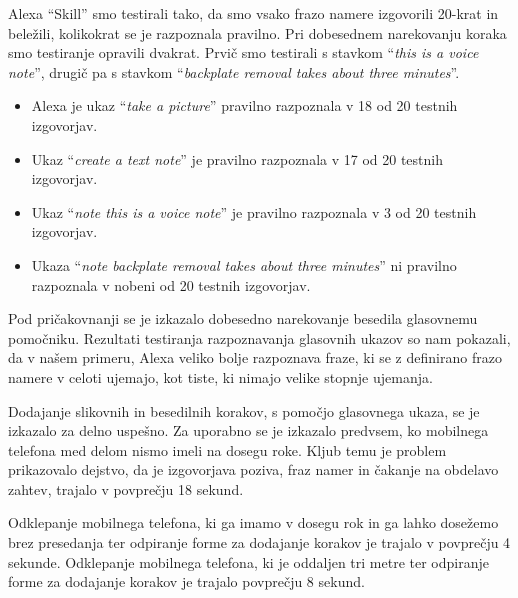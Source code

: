 \documentclass[a4paper, 12pt]{book}
\begin{document}
Alexa \enquote{Skill} smo testirali tako, da smo vsako frazo namere izgovorili 20-krat in beležili, kolikokrat se je razpoznala pravilno.
Pri dobesednem narekovanju koraka smo testiranje opravili dvakrat.
Prvič smo testirali s stavkom \enquote{\textit{this is a voice note}}, drugič pa s stavkom \enquote{\textit{backplate removal takes about three minutes}}.
\begin{itemize}
	\item Alexa je ukaz \enquote{\textit{take a picture}} pravilno razpoznala v 18 od 20 testnih izgovorjav.
	\item Ukaz \enquote{\textit{create a text note}} je pravilno razpoznala v 17 od 20 testnih izgovorjav.
	\item Ukaz \enquote{\textit{note this is a voice note}} je pravilno razpoznala v 3 od 20 testnih izgovorjav.
	\item Ukaza \enquote{\textit{note backplate removal takes about three minutes}} ni pravilno razpoznala v nobeni od 20 testnih izgovorjav.
\end{itemize}
Pod pričakovnanji se je izkazalo dobesedno narekovanje besedila glasovnemu pomočniku.
Rezultati testiranja razpoznavanja glasovnih ukazov so nam pokazali, da v našem primeru, Alexa veliko bolje razpoznava fraze, ki se z definirano frazo namere v celoti ujemajo, kot tiste, ki nimajo velike stopnje ujemanja.

Dodajanje slikovnih in besedilnih korakov, s pomočjo glasovnega ukaza, se je izkazalo za delno uspešno.
Za uporabno se je izkazalo predvsem, ko mobilnega telefona med delom nismo imeli na dosegu roke.
Kljub temu je problem prikazovalo dejstvo, da je izgovorjava poziva, fraz namer in čakanje na obdelavo zahtev, trajalo v povprečju 18 sekund.


Odklepanje mobilnega telefona, ki ga imamo v dosegu rok in ga lahko dosežemo brez presedanja ter odpiranje forme za dodajanje korakov je trajalo v povprečju 4 sekunde.
Odklepanje mobilnega telefona, ki je oddaljen tri metre ter odpiranje forme za dodajanje korakov je trajalo povprečju 8 sekund.


\end{document}
